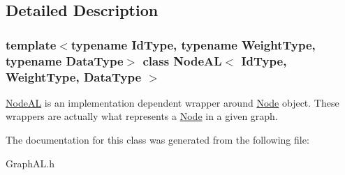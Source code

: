 \subsection{Detailed Description}
\subsubsection*{template$<$typename Id\+Type, typename Weight\+Type, typename Data\+Type$>$\newline
class Node\+A\+L$<$ Id\+Type, Weight\+Type, Data\+Type $>$}

\hyperlink{class_node_a_l}{Node\+AL} is an implementation dependent wrapper around \hyperlink{class_node}{Node} object. These wrappers are actually what represents a \hyperlink{class_node}{Node} in a given graph. 

The documentation for this class was generated from the following file\+:\begin{DoxyCompactItemize}
\item 
Graph\+A\+L.\+h\end{DoxyCompactItemize}
